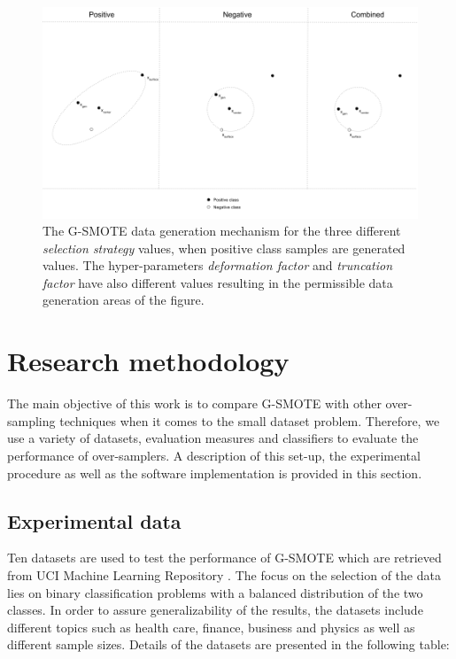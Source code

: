\documentclass[parskip=full]{scrartcl}
\begin{document}
\begin{figure}[H]
	\centering
	\includegraphics[width=1\linewidth]{../analysis/smote_mechanism.png}
	\caption{The G-SMOTE data generation mechanism for the three 
	different \textit{selection strategy} values, when positive class 
	samples are generated  values. The hyper-parameters 
	\textit{deformation factor} and \textit{truncation factor} 
	have also different values resulting in the permissible 
	data generation areas of the figure.}
	\label{fig:gsmotemechanism}
\end{figure}

\section{Research methodology}

The main objective of this work is to compare G-SMOTE with other over-sampling
techniques when it comes to the small dataset problem. Therefore, we use a
variety of datasets, evaluation measures and classifiers to evaluate the
performance of over-samplers. A description of this set-up, the experimental
procedure as well as the software implementation is provided in this section.

\subsection{Experimental data}

Ten datasets are used to test the performance of G-SMOTE which are retrieved
from UCI Machine Learning Repository \cite{Dua.2019}. The focus on the selection
of the data lies on binary classification problems with a balanced distribution
of the two classes. In order to assure generalizability of the results, the
datasets include different topics such as health care, finance, business and
physics as well as different sample sizes. Details of the datasets are presented
in the following table:
\end{document}
